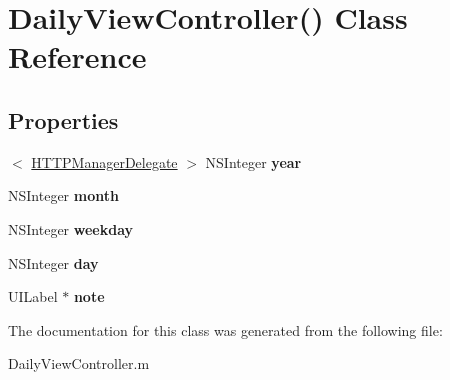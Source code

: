 \hypertarget{interface_daily_view_controller_07_08}{\section{\-Daily\-View\-Controller() \-Class \-Reference}
\label{interface_daily_view_controller_07_08}
}
\subsection*{\-Properties}
\begin{DoxyCompactItemize}
\item 
\hypertarget{interface_daily_view_controller_07_08_a36a272beb2512a08a80d14311a621313}{$<$ \hyperlink{protocol_h_t_t_p_manager_delegate-p}{\-H\-T\-T\-P\-Manager\-Delegate} $>$ \-N\-S\-Integer {\bfseries year}}\label{interface_daily_view_controller_07_08_a36a272beb2512a08a80d14311a621313}

\item 
\hypertarget{interface_daily_view_controller_07_08_a5c80677a5d5ff87b5a1a0e1599045672}{\-N\-S\-Integer {\bfseries month}}\label{interface_daily_view_controller_07_08_a5c80677a5d5ff87b5a1a0e1599045672}

\item 
\hypertarget{interface_daily_view_controller_07_08_af7c59dac4200affb7e4a30ef33b1e6cb}{\-N\-S\-Integer {\bfseries weekday}}\label{interface_daily_view_controller_07_08_af7c59dac4200affb7e4a30ef33b1e6cb}

\item 
\hypertarget{interface_daily_view_controller_07_08_aed7391676fe0644d91739860bd3e9d17}{\-N\-S\-Integer {\bfseries day}}\label{interface_daily_view_controller_07_08_aed7391676fe0644d91739860bd3e9d17}

\item 
\hypertarget{interface_daily_view_controller_07_08_aff1c6ff12fd467cd629ff84fad08eb13}{\-U\-I\-Label $\ast$ {\bfseries note}}\label{interface_daily_view_controller_07_08_aff1c6ff12fd467cd629ff84fad08eb13}

\end{DoxyCompactItemize}


\-The documentation for this class was generated from the following file\-:\begin{DoxyCompactItemize}
\item 
\-Daily\-View\-Controller.\-m\end{DoxyCompactItemize}
